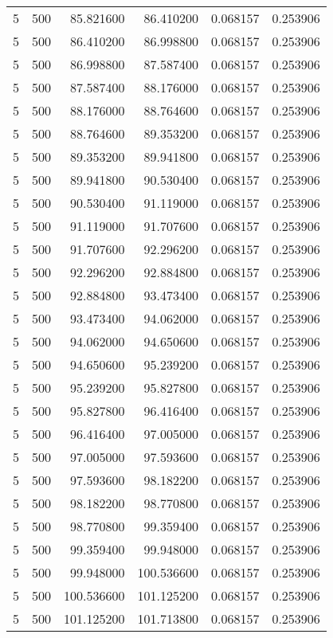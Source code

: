 \begin{longtable}{rrrrrr}
5 & 500 & 85.821600 & 86.410200 & 0.068157 & 0.253906 \\
5 & 500 & 86.410200 & 86.998800 & 0.068157 & 0.253906 \\
5 & 500 & 86.998800 & 87.587400 & 0.068157 & 0.253906 \\
5 & 500 & 87.587400 & 88.176000 & 0.068157 & 0.253906 \\
5 & 500 & 88.176000 & 88.764600 & 0.068157 & 0.253906 \\
5 & 500 & 88.764600 & 89.353200 & 0.068157 & 0.253906 \\
5 & 500 & 89.353200 & 89.941800 & 0.068157 & 0.253906 \\
5 & 500 & 89.941800 & 90.530400 & 0.068157 & 0.253906 \\
5 & 500 & 90.530400 & 91.119000 & 0.068157 & 0.253906 \\
5 & 500 & 91.119000 & 91.707600 & 0.068157 & 0.253906 \\
5 & 500 & 91.707600 & 92.296200 & 0.068157 & 0.253906 \\
5 & 500 & 92.296200 & 92.884800 & 0.068157 & 0.253906 \\
5 & 500 & 92.884800 & 93.473400 & 0.068157 & 0.253906 \\
5 & 500 & 93.473400 & 94.062000 & 0.068157 & 0.253906 \\
5 & 500 & 94.062000 & 94.650600 & 0.068157 & 0.253906 \\
5 & 500 & 94.650600 & 95.239200 & 0.068157 & 0.253906 \\
5 & 500 & 95.239200 & 95.827800 & 0.068157 & 0.253906 \\
5 & 500 & 95.827800 & 96.416400 & 0.068157 & 0.253906 \\
5 & 500 & 96.416400 & 97.005000 & 0.068157 & 0.253906 \\
5 & 500 & 97.005000 & 97.593600 & 0.068157 & 0.253906 \\
5 & 500 & 97.593600 & 98.182200 & 0.068157 & 0.253906 \\
5 & 500 & 98.182200 & 98.770800 & 0.068157 & 0.253906 \\
5 & 500 & 98.770800 & 99.359400 & 0.068157 & 0.253906 \\
5 & 500 & 99.359400 & 99.948000 & 0.068157 & 0.253906 \\
5 & 500 & 99.948000 & 100.536600 & 0.068157 & 0.253906 \\
5 & 500 & 100.536600 & 101.125200 & 0.068157 & 0.253906 \\
5 & 500 & 101.125200 & 101.713800 & 0.068157 & 0.253906 \\

\end{longtable}
